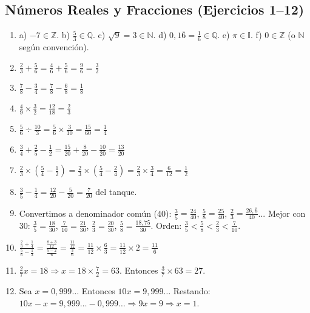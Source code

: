 \documentclass[12pt, letterpaper]{article}
\begin{document}
  \subsection*{Números Reales y Fracciones (Ejercicios 1--12)}

  \begin{enumerate}[leftmargin=*, label=\textbf{\arabic*.}]
    \item a) $-7 \in \mathbb{Z}$. \quad b) $\frac{5}{3} \in \mathbb{Q}$. \quad c) $\sqrt{9} = 3 \in \mathbb{N}$. \quad d) $0{,}1\overline{6} = \frac{1}{6} \in \mathbb{Q}$. \quad e) $\pi \in \mathbb{I}$. \quad f) $0 \in \mathbb{Z}$ (o $\mathbb{N}$ según convención).

    \item $\frac{2}{3} + \frac{5}{6} = \frac{4}{6} + \frac{5}{6} = \frac{9}{6} = \frac{3}{2}$

    \item $\frac{7}{8} - \frac{3}{4} = \frac{7}{8} - \frac{6}{8} = \frac{1}{8}$

    \item $\frac{4}{9} \times \frac{3}{2} = \frac{12}{18} = \frac{2}{3}$

    \item $\frac{5}{6} \div \frac{10}{3} = \frac{5}{6} \times \frac{3}{10} = \frac{15}{60} = \frac{1}{4}$

    \item $\frac{3}{4} + \frac{2}{5} - \frac{1}{2} = \frac{15}{20} + \frac{8}{20} - \frac{10}{20} = \frac{13}{20}$

    \item $\frac{2}{3} \times \left(\frac{5}{4} - \frac{1}{2}\right) = \frac{2}{3} \times \left(\frac{5}{4} - \frac{2}{4}\right) = \frac{2}{3} \times \frac{3}{4} = \frac{6}{12} = \frac{1}{2}$

    \item $\frac{3}{5} - \frac{1}{4} = \frac{12}{20} - \frac{5}{20} = \frac{7}{20}$ del tanque.

    \item Convertimos a denominador común (40): $\frac{3}{5} = \frac{24}{40}$, $\frac{5}{8} = \frac{25}{40}$, $\frac{2}{3} = \frac{26{,}\overline{6}}{40}$... Mejor con 30: $\frac{3}{5} = \frac{18}{30}$, $\frac{7}{10} = \frac{21}{30}$, $\frac{2}{3} = \frac{20}{30}$, $\frac{5}{8} = \frac{18{,}75}{30}$. Orden: $\frac{3}{5} < \frac{5}{8} < \frac{2}{3} < \frac{7}{10}$.

    \item $\frac{\frac{2}{3} + \frac{1}{4}}{\frac{5}{6} - \frac{1}{3}} = \frac{\frac{8+3}{12}}{\frac{5-2}{6}} = \frac{\frac{11}{12}}{\frac{3}{6}} = \frac{11}{12} \times \frac{6}{3} = \frac{11}{12} \times 2 = \frac{11}{6}$

    \item $\frac{2}{7}x = 18 \Rightarrow x = 18 \times \frac{7}{2} = 63$. Entonces $\frac{3}{7} \times 63 = 27$.

    \item Sea $x = 0{,}999\ldots$ Entonces $10x = 9{,}999\ldots$ Restando: $10x - x = 9{,}999\ldots - 0{,}999\ldots \Rightarrow 9x = 9 \Rightarrow x = 1$.
  \end{enumerate}
\end{document}
